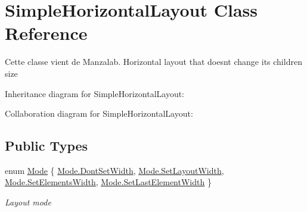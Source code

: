 \hypertarget{class_simple_horizontal_layout}{}\section{Simple\+Horizontal\+Layout Class Reference}
\label{class_simple_horizontal_layout}


Cette classe vient de Manzalab. Horizontal layout that doesn\textquotesingle{}t change its children size  




Inheritance diagram for Simple\+Horizontal\+Layout\+:


Collaboration diagram for Simple\+Horizontal\+Layout\+:
\subsection*{Public Types}
\begin{DoxyCompactItemize}
\item 
enum \hyperlink{class_simple_horizontal_layout_a84c3989f969567fef94985df15d7d03f}{Mode} \{ \hyperlink{class_simple_horizontal_layout_a84c3989f969567fef94985df15d7d03fab3c79047c3a18f754e66d17ef17552c9}{Mode.\+Dont\+Set\+Width}, 
\hyperlink{class_simple_horizontal_layout_a84c3989f969567fef94985df15d7d03fadc1445e941c98968ee22f8bca2c11614}{Mode.\+Set\+Layout\+Width}, 
\hyperlink{class_simple_horizontal_layout_a84c3989f969567fef94985df15d7d03fa362a8f26c823d46b3b806a608f17fcf2}{Mode.\+Set\+Elements\+Width}, 
\hyperlink{class_simple_horizontal_layout_a84c3989f969567fef94985df15d7d03fab5860197d2ec3428daabf7a15882a098}{Mode.\+Set\+Last\+Element\+Width}
 \}\begin{DoxyCompactList}\small\item\em Layout mode \end{DoxyCompactList}
\end{DoxyCompactItemize}

